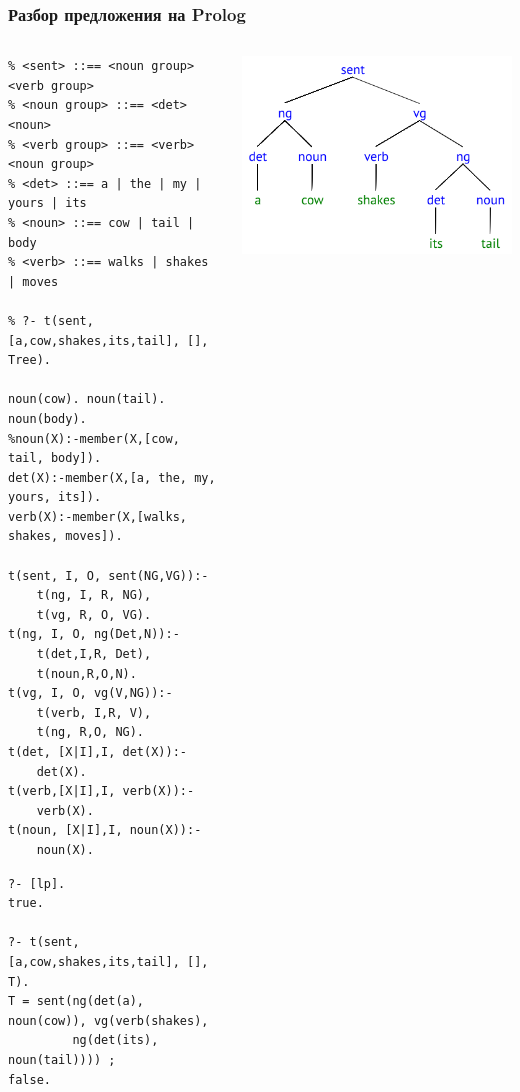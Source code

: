 \documentclass[10pt]{beamer}
\begin{document}
\begin{frame}
  \frametitle{Разбор предложения на Prolog}
  \begin{columns}
  \begin{column}{0.5\textwidth}
\begin{verbatim}
% <sent> ::== <noun group> <verb group>
% <noun group> ::== <det> <noun>
% <verb group> ::== <verb> <noun group>
% <det> ::== a | the | my | yours | its
% <noun> ::== cow | tail | body
% <verb> ::== walks | shakes | moves

% ?- t(sent, [a,cow,shakes,its,tail], [], Tree).

noun(cow). noun(tail). noun(body).
%noun(X):-member(X,[cow, tail, body]).
det(X):-member(X,[a, the, my, yours, its]).
verb(X):-member(X,[walks, shakes, moves]).

t(sent, I, O, sent(NG,VG)):-
    t(ng, I, R, NG),
    t(vg, R, O, VG).
t(ng, I, O, ng(Det,N)):-
    t(det,I,R, Det),
    t(noun,R,O,N).
t(vg, I, O, vg(V,NG)):-
    t(verb, I,R, V),
    t(ng, R,O, NG).
t(det, [X|I],I, det(X)):-
    det(X).
t(verb,[X|I],I, verb(X)):-
    verb(X).
t(noun, [X|I],I, noun(X)):-
    noun(X).
\end{verbatim}
\begin{verbatim}
?- [lp].
true.

?- t(sent, [a,cow,shakes,its,tail], [], T).
T = sent(ng(det(a), noun(cow)), vg(verb(shakes),
         ng(det(its), noun(tail)))) ;
false.
\end{verbatim}
  \end{column}
  \begin{column}{0.5\textwidth}
    \includegraphics[width=1\linewidth]{pics/cow-its-tail.png}
  \end{column}
\end{columns}
\end{frame}
\end{document}
